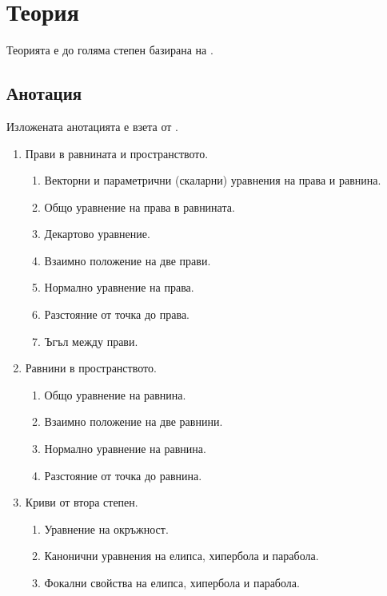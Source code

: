 \documentclass{../../common/topic}
\begin{document}
\maketitle

\section{Теория}

Теорията е до голяма степен базирана на \cite{LectureNotes}.

\subsection{Анотация}

Изложената анотацията е взета от \cite{Syllabus}.

\begin{enumerate}
  \item Прави в равнината и пространството.
  \begin{enumerate}
    \item Векторни и параметрични (скаларни) уравнения на права и равнина.
    \item Общо уравнение на права в равнината.
    \item Декартово уравнение.
    \item Взаимно положение на две прави.
    \item Нормално уравнение на права.
    \item Разстояние от точка до права.
    \item Ъгъл между прави.
  \end{enumerate}

  \item Равнини в пространството.
  \begin{enumerate}
    \item Общо уравнение на равнина.
    \item Взаимно положение на две равнини.
    \item Нормално уравнение на равнина.
    \item Разстояние от точка до равнина.
  \end{enumerate}

  \item Криви от втора степен.
  \begin{enumerate}
    \item Уравнение на окръжност.
    \item Канонични уравнения на елипса, хипербола и парабола.
    \item Фокални свойства на елипса, хипербола и парабола.
  \end{enumerate}
\end{enumerate}
\end{document}
